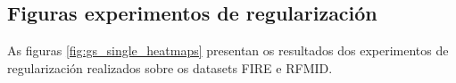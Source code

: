 

\subsection{Figuras experimentos de regularización}
\label{subsec:figuras_experimentos_regularizacion}


As figuras \ref{fig:gs_single_heatmaps} presentan os resultados dos experimentos de regularización realizados sobre os datasets FIRE e RFMID.


